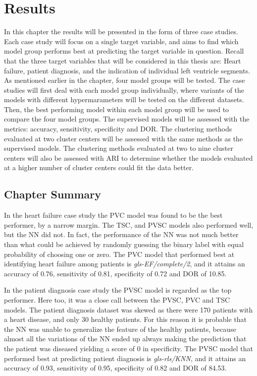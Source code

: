\chapter{Results}

In this chapter the results will be presented in the form of three case studies. 
Each case study will focus on a single target variable, and aims to find which model group performs best at predicting the target variable in question.
Recall that the three target variables that will be considered in this thesis are: Heart failure, patient diagnosis, and the indication of individual left ventricle segments.
As mentioned earlier in the chapter, four model groups will be tested. 
The case studies will first deal with each model group individually, where variants of the models with different hypermarameters will be tested on the different datasets. 
Then, the best performing model within each model group will be used to compare the four model groups.
The supervised models will be assessed with the metrics: accuracy, sensitivity, specificity and DOR.
The clustering methods evaluated at two cluster centers will be assessed with the same methods as the supervised models. 
The clustering methods evaluated at two to nine cluster centers will also be assessed with ARI to determine 
whether the models evaluated at a higher number of cluster centers could fit the data better.





\newpage
\section{Chapter Summary}

In the heart failure case study the PVC model was found to be the best performer, by a narrow margin. 
The TSC, and PVSC models also performed well, but the NN did not. In fact, the performance of the NN was not much better 
than what could be achieved by randomly guessing the binary label with equal probability of choosing one or zero. 
The PVC model that performed best at identifying heart failure among patients is \textit{gls-EF/complete/2}, and it attains an 
accuracy of 0.76, sensitivity of 0.81, specificity of 0.72 and DOR of 10.85. \medskip

In the patient diagnosis case study the PVSC model is regarded as the top performer.
Here too, it was a close call between the PVSC, PVC and TSC models.
The patient diagnosis dataset was skewed as there were 170 patients with a heart disease, and only 30 healthy patients. 
For this reason it is probable that the NN was unable to generalize the feature of the healthy patients, 
because almost all the variations of the NN ended up always making the prediction that the patient was diseased yielding a score of 0 in specificity. \smallskip
The PVSC model that performed best at predicting patient diagnosis is \textit{gls-rls/KNN}, and it attains an
accuracy of 0.93, sensitivity of 0.95, specificity of 0.82 and DOR of 84.53. \medskip

